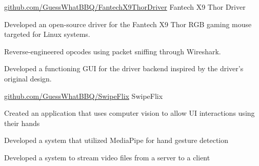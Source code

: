 

\begin{cventries}


  \cventry
    {\href{https://github.com/GuessWhatBBQ/FantechX9ThorDriver}{\faGithubSquare\acvHeaderIconSep github.com/GuessWhatBBQ/FantechX9ThorDriver}}
    {Fantech X9 Thor Driver}
    {}
    {} %
    {
      \begin{cvitems} %
        \item Developed an open-source driver for the Fantech X9 Thor RGB gaming mouse
targeted for Linux systems.
        \item Reverse-engineered opcodes using packet sniffing through Wireshark.
        \item Developed a functioning GUI for the driver backend inspired by the driver's original design.
      \end{cvitems}
    }

  \cventry
    {\href{https://github.com/GuessWhatBBQ/SwipeFlix}
    {\faGithubSquare\acvHeaderIconSep github.com/GuessWhatBBQ/SwipeFlix}}
    {SwipeFlix}
    {}
    {} %
    {
      \begin{cvitems} %
        \item Created an application that uses computer vision to allow UI interactions using their hands
        \item Developed a system that utilized MediaPipe for hand gesture detection
        \item Developed a system to stream video files from a server to a client
      \end{cvitems}
    }

\end{cventries}

